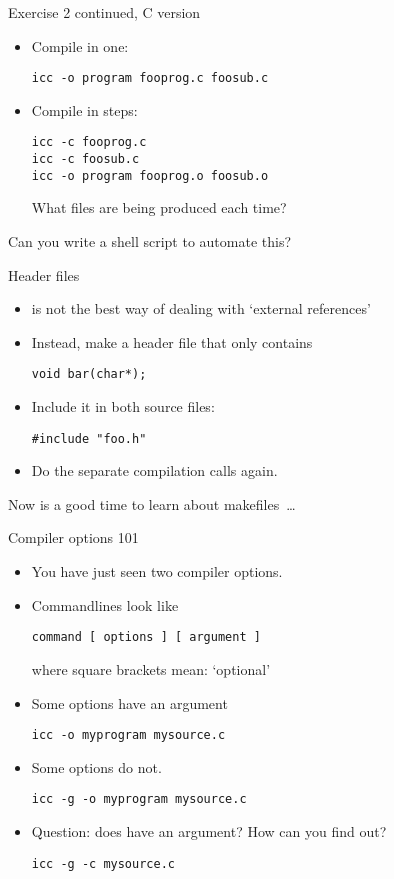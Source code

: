 \documentclass[11pt,headernav]{beamer}
\begin{document}
\begin{numberedframe}{Exercise 2 continued, C version}
  \begin{itemize}
  \item Compile in one:
\begin{verbatim}
icc -o program fooprog.c foosub.c
\end{verbatim}
\item Compile in steps:
\begin{verbatim}
icc -c fooprog.c
icc -c foosub.c
icc -o program fooprog.o foosub.o
\end{verbatim}
What files are being produced each time?
  \end{itemize}
Can you write a shell script to automate this?  
\end{numberedframe}

\begin{numberedframe}{Header files}
  \begin{itemize}
  \item
     is not the best way of dealing with `external references'
  \item Instead, make a header file  that only contains
\begin{lstlisting}
void bar(char*);
\end{lstlisting}
\item Include it in both source files:
\begin{lstlisting}
#include "foo.h"
\end{lstlisting}
\item Do the separate compilation calls again.
  \end{itemize}
  Now is a good time to learn about makefiles~\ldots
\end{numberedframe}

\begin{numberedframe}{Compiler options 101}
  \label{sl-tut:option1}
  \begin{itemize}
  \item You have just seen two compiler options.
  \item Commandlines look like
\begin{verbatim}
command [ options ] [ argument ]
\end{verbatim}
where square brackets mean: `optional'
\item Some options have an argument
\begin{verbatim}
icc -o myprogram mysource.c
\end{verbatim}
\item Some options do not.
\begin{verbatim}
icc -g -o myprogram mysource.c
\end{verbatim}
\item Question: does  have an argument? How can you find out?
\begin{verbatim}
icc -g -c mysource.c
\end{verbatim}
  \end{itemize}
\end{numberedframe}
\end{document}
